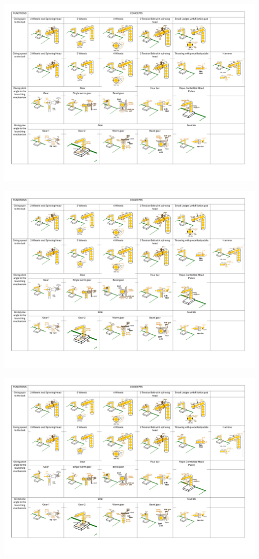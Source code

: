 \documentclass[12pt]{article}
\begin{document}
\begin{center}
    \includegraphics[width=1.4\textwidth, page=1, angle=90]{morphological.pdf}
\end{center}


\begin{center}
    \includegraphics[width=1.4\textwidth, page=2, angle=90]{morphological.pdf} %
\end{center}

\begin{center}
    \includegraphics[width=1.4\textwidth, page=3, angle=90]{morphological.pdf} %
\end{center}
\end{document}
